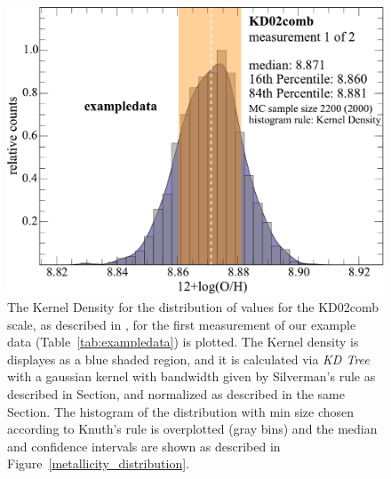 \documentclass{emulateapj}
\begin{document}
\begin{figure}[ht!]
  \includegraphics[width=1.0\columnwidth]{exampledata_n2000_KD02comb_1KDE.pdf}
   \caption{The Kernel Density for the distribution of values for the KD02comb scale, as described in \citet{kewley08}, for the first measurement of our example data (Table~\ref{tab:exampledata}) is plotted. The Kernel density is displayes as a blue shaded region, and it is calculated via \emph{KD Tree} with a gaussian kernel with bandwidth given by Silverman's rule as described in Section\label{vizs}, and normalized as described in the same Section. The histogram of the distribution with min size chosen according to Knuth's rule is overplotted (gray bins) and the median and confidence intervals are shown as described in Figure~\ref{metallicity_distribution}.}\label{fig:KDE}

\end{figure}
\end{document}

